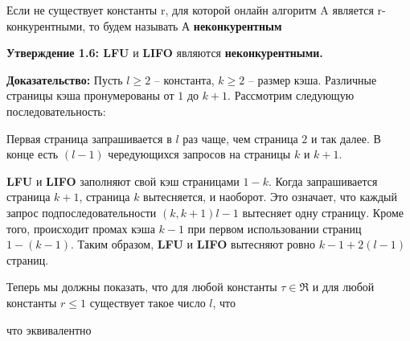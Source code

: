 Если не существует константы r, для которой онлайн алгоритм A является r-конкурентными, то будем называть А \textbf{неконкурентным}

\vspace{\baselineskip}

\textbf{Утверждение 1.6: LFU} и \textbf{LIFO} являются \textbf{неконкурентными.}

\vspace{\baselineskip}

\textbf{Доказательство:} Пусть $l \geqslant 2$ – константа, $k \geqslant 2$ – размер кэша. Различные страницы кэша пронумерованы от $1$ до $k+1$. Рассмотрим следующую последовательность:

\vspace{\baselineskip}


\vspace{\baselineskip}

Первая страница запрашивается в $l$ раз чаще, чем страница $2$ и так далее. В конце есть $(l-1)$ чередующихся запросов на страницы $k$ и $k+1$.

\textbf{LFU} и \textbf{LIFO} заполняют свой кэш страницами $1-k$. Когда запрашивается страница $k+1$, страница $k$ вытесняется, и наоборот. Это означает, что каждый запрос подпоследовательности $(k, k+1)l-1$ вытесняет одну страницу. Кроме того, происходит промах кэша $k-1$ при первом использовании страниц $1-(k-1)$. Таким образом, \textbf{LFU} и \textbf{LIFO} вытесняют ровно $k-1+2(l-1)$ страниц.

\vspace{\baselineskip}

Теперь мы должны показать, что для любой константы $\tau \in \Re$ и для любой константы $r \leqslant 1$ существует такое число $l$, что

\vspace{\baselineskip}


\vspace{\baselineskip}

что эквивалентно

\vspace{\baselineskip}


